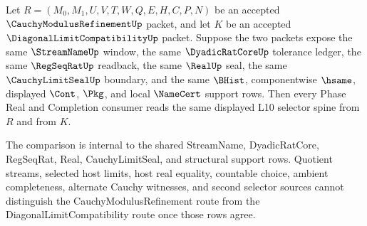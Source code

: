 \begin{theorem}
\label{thm:cauchy-modulus-refinement-l10-consumer-spine-comparison}
Let $R=(M_0,M_1,U,V,T,W,Q,E,H,C,P,N)$ be an accepted $\CauchyModulusRefinementUp$ packet, and let $K$ be an accepted $\DiagonalLimitCompatibilityUp$ packet. Suppose the two packets expose the same $\StreamNameUp$ window, the same $\DyadicRatCoreUp$ tolerance ledger, the same $\RegSeqRatUp$ readback, the same $\RealUp$ seal, the same $\CauchyLimitSealUp$ boundary, and the same $\BHist$, componentwise $\hsame$, displayed $\Cont$, $\Pkg$, and local $\NameCert$ support rows. Then every Phase Real and Completion consumer reads the same displayed L10 selector spine from $R$ and from $K$.

The comparison is internal to the shared StreamName, DyadicRatCore, RegSeqRat, Real, CauchyLimitSeal, and structural support rows. Quotient streams, selected host limits, host real equality, countable choice, ambient completeness, alternate Cauchy witnesses, and second selector sources cannot distinguish the CauchyModulusRefinement route from the DiagonalLimitCompatibility route once those rows agree.
\end{theorem}
